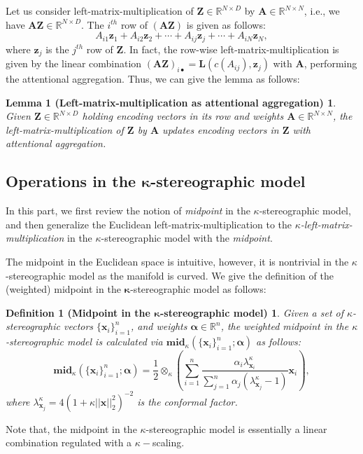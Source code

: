 Let us consider left-matrix-multiplication of $\mathbf Z\in \mathbb R^{N \times D}$ by $\mathbf A\in \mathbb R^{N \times N}$, i.e., we have $\mathbf A\mathbf Z \in \mathbb R^{N \times D}$.  
The $i^{th}$ row of $(\mathbf A\mathbf Z)$ is given as follows:
\begin{equation}
A_{i1}\boldsymbol z_1+A_{i2}\boldsymbol z_2 + \cdots + A_{ij}\boldsymbol z_j+ \cdots +A_{iN}\boldsymbol z_N,
\end{equation}
where $ \boldsymbol z_j$ is the $j^{th}$ row of $\mathbf Z$.
In fact, the row-wise left-matrix-multiplication is given by the linear combination $(\mathbf A\mathbf Z)_{i \bullet}=\boldsymbol L(c(A_{ij}), \boldsymbol z_j)$ with $\mathbf A$, performing the attentional aggregation.
Thus, we can give the lemma as follows:
\newtheorem*{lemma}{Lemma 1 (Left-matrix-multiplication as attentional aggregation)}
\begin{lemma}
Given $\mathbf{Z}\in \mathbb R^{N \times D}$ holding encoding vectors in its row and weights $\mathbf{A}\in \mathbb R^{N \times N}$, 
the left-matrix-multiplication of $\mathbf{Z}$ by $\mathbf{A}$ updates encoding vectors in $\mathbf{Z}$ with attentional aggregation.
\end{lemma}

\subsection{Operations in the $\boldsymbol \kappa$-stereographic model}
In this part, we first review the notion of \emph{midpoint} in the $\kappa$-stereographic model, and then generalize the Euclidean left-matrix-multiplication  to the \emph{$\kappa$-left-matrix-multiplication} in the $ \kappa$-stereographic model with the \emph{midpoint}.

The midpoint in the Euclidean space is intuitive, however, it is nontrivial in the $\kappa$-stereographic model as the manifold is curved.
We give the definition of the (weighted) midpoint in the $\boldsymbol \kappa$-stereographic model as follows:
\newtheorem*{def2}{Definition 1 (Midpoint in the $\boldsymbol \kappa$-stereographic model)} 
\begin{def2}
Given a set of  $\kappa$-stereographic vectors $\{\mathbf{x}_{i}\}_{i=1}^n$, and weights $\boldsymbol{\alpha} \in \mathbb R^n$,
the weighted midpoint in the $\kappa$-stereographic model is calculated via $\mathbf{mid}_{\kappa}\left( \{\mathbf{x}_{i}\}_{i=1}^n ; \boldsymbol{\alpha}\right)$ as follows:
\begin{equation}
\mathbf{mid}_{\kappa}\left( \{\mathbf{x}_{i}\}_{i=1}^n ; \boldsymbol{\alpha}\right)=\frac{1}{2} \otimes_{\kappa} \left(\sum_{i=1}^{n} \frac{\alpha_{i} \lambda_{\mathbf{x}_{i}}^{\kappa}}{\sum_{j=1}^{n} \alpha_{j} (\lambda_{\mathbf{x}_{j}}^{\kappa}-1)} \mathbf{x}_{i}\right),
\end{equation}
where  $\lambda_{\mathbf{x}_{j}}^{\kappa}=4\left(1+\kappa||\mathbf x||_2^2\right)^{-2}$ is the conformal factor.
\end{def2}
\noindent Note that, the midpoint in the $\kappa$-stereographic model is essentially a linear combination regulated with a $\kappa-$scaling.

